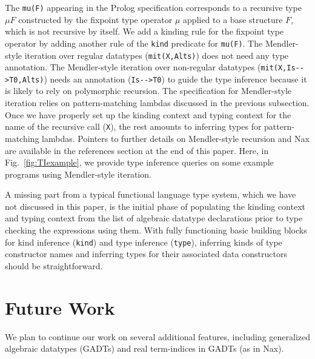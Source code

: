 \documentclass[runningheads,a4paper]{llncs}
\begin{document}
The \verb|mu(F)| appearing in the Prolog specification corresponds to
a recursive type $\mu F$ constructed by the fixpoint type operator $\mu$
applied to a base structure $F$, which is not recursive by itself.
We add a kinding rule for the fixpoint type operator
by adding another rule of the \verb|kind| predicate for \verb|mu(F)|.
The Mendler-style iteration over regular datatypes (\verb|mit(X,Alts)|)
does not need any type annotation. The Mendler-style iteration over
non-regular datatypes (\verb|mit(X,Is-->T0,Alts)|) needs an annotation
(\verb|Is-->T0|) to guide the type inference because it is likely to rely on
polymorphic recursion. The specification for Mendler-style iteration relies
on pattern-matching lambdas discussed in the previous subsection. Once we have
properly set up the kinding context and typing context for the name of
the recursive call (\verb|X|), the rest amounts to inferring types for
pattern-matching lambdas. Pointers to further details on Mendler-style
recursion \cite{vene00phd,AbeMatUus03,AhnShe11} and Nax \cite{Ahn14thesis}
are available in the references section at the end of this paper.
Here, in Fig.~\ref{fig:TIexample}, we provide type inference queries on
some example programs using Mendler-style iteration.




A missing part from a typical functional language type system, which
we have not discussed in this paper, is the initial phase of populating
the kinding context and typing context from the list of algebraic datatype
declarations prior to type checking the expressions using them.
With fully functioning basic building blocks for kind inference
(\verb|kind|) and type inference (\verb|type|), inferring kinds of
type constructor names and inferring types for their associated
data constructors should be straightforward.


\section{Future Work}\label{sec:futwork}
We plan to continue our work on several additional features, including
generalized algebraic datatypes (GADTs) and real term-indices
in GADTs (as in Nax). %
\end{document}

